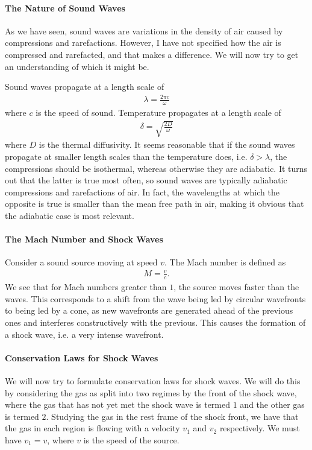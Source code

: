 \paragraph{The Nature of Sound Waves}
As we have seen, sound waves are variations in the density of air caused by compressions and rarefactions. However, I have not specified how the air is compressed and rarefacted, and that makes a difference. We will now try to get an understanding of which it might be.

Sound waves propagate at a length scale of
\begin{align*}
	\lambda = \frac{2\pi c}{\omega}
\end{align*}
where $c$ is the speed of sound. Temperature propagates at a length scale of
\begin{align*}
	\delta = \sqrt{\frac{2D}{\omega}}
\end{align*}
where $D$ is the thermal diffusivity. It seems reasonable that if the sound waves propagate at smaller length scales than the temperature does, i.e. $\delta > \lambda$, the compressions should be isothermal, whereas otherwise they are adiabatic. It turns out that the latter is true most often, so sound waves are typically adiabatic compressions and rarefactions of air. In fact, the wavelengths at which the opposite is true is smaller than the mean free path in air, making it obvious that the adiabatic case is most relevant.

\paragraph{The Mach Number and Shock Waves}
Consider a sound source moving at speed $v$. The Mach number is defined as
\begin{align*}
	M = \frac{v}{c}.
\end{align*}
We see that for Mach numbers greater than $1$, the source moves faster than the waves. This corresponds to a shift from the wave being led by circular wavefronts to being led by a cone, as new wavefronts are generated ahead of the previous ones and interferes constructively with the previous. This causes the formation of a shock wave, i.e. a very intense wavefront.

\paragraph{Conservation Laws for Shock Waves}
We will now try to formulate conservation laws for shock waves. We will do this by considering the gas as split into two regimes by the front of the shock wave, where the gas that has not yet met the shock wave is termed $1$ and the other gas is termed $2$. Studying the gas in the rest frame of the shock front, we have that the gas in each region is flowing with a velocity $v_{1}$ and $v_{2}$ respectively. We must have $v_{1} = v$, where $v$ is the speed of the source.

